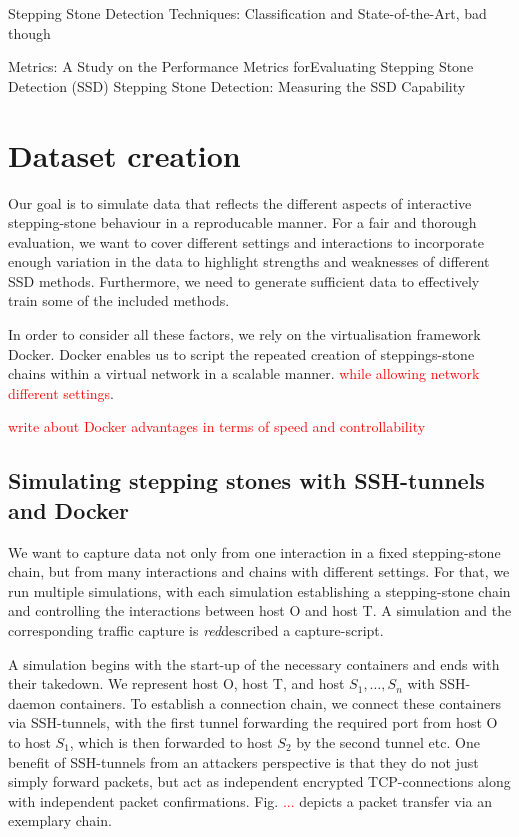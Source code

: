 \documentclass[runningheads]{llncs}\usepackage[]{graphicx}\usepackage[]{color}
\begin{document}
Stepping Stone Detection Techniques: Classification and State-of-the-Art, bad though

Metrics: A Study on the Performance Metrics forEvaluating Stepping Stone Detection (SSD)
Stepping Stone Detection: Measuring the SSD Capability


\section{Dataset creation}\label{Sec:Datasetcreation}

Our goal is to simulate data that reflects the different aspects of interactive stepping-stone behaviour in a reproducable manner. For a fair and thorough evaluation, we want to cover different settings and interactions to incorporate enough variation in the data to highlight strengths and weaknesses of different SSD methods. Furthermore, we need to generate sufficient data to effectively train some of the included methods. 

In order to consider all these factors, we rely on the virtualisation framework Docker. Docker enables us to script the repeated creation of steppings-stone chains within a virtual network in a scalable manner. \textcolor{red}{while allowing network different settings}. 

\textcolor{red}{write about Docker advantages in terms of speed and controllability}

\subsection{Simulating stepping stones with SSH-tunnels and Docker}\label{Sec:Setup}

We want to capture data not only from one interaction in a fixed stepping-stone chain, but from many interactions and chains with different settings. For that, we run multiple simulations, with each simulation establishing a stepping-stone chain and controlling the interactions between host O and host T. A simulation and the corresponding traffic capture is \textit{red}{described} a capture-script. 

A simulation begins with the start-up of the necessary containers and ends with their takedown. We represent host O, host T, and host $S_1,\dots,S_n$ with SSH-daemon containers.  To establish a connection chain, we connect these containers via SSH-tunnels, with the first tunnel forwarding the required port from host O to host $S_1$, which is then forwarded to host $S_2$ by the second tunnel etc. One benefit of SSH-tunnels from an attackers perspective is that they do not just simply forward packets, but act as independent encrypted TCP-connections along with independent packet confirmations.  Fig. \textcolor{red}{...} depicts a packet transfer via an exemplary chain. 
\end{document}
